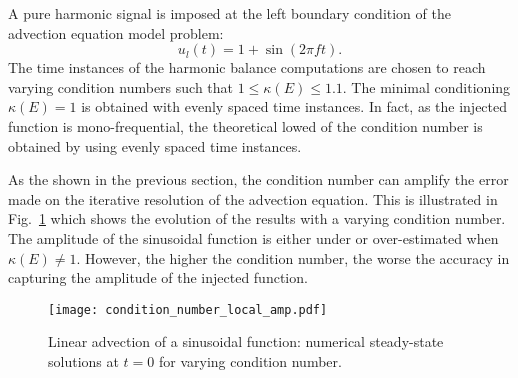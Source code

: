 
A pure harmonic signal is imposed at the left boundary condition
of the advection equation model problem:
\begin{equation}
   u_l (t) = 1 + \sin \left(2 \pi f t\right).
\end{equation}
The time instances of the harmonic balance
computations are chosen to reach varying condition numbers
such that $1 \leq \kappa (E) \leq 1.1$.  
The minimal conditioning
$\kappa(E) = 1$ is obtained with evenly spaced time instances.
In fact, as the injected function is mono-frequential, 
the theoretical lowed of the condition number is obtained by using evenly
spaced time instances.

As the shown in the previous section, the condition number 
can amplify the error made
on the iterative resolution of the advection equation.
This is illustrated in Fig.~\ref{fig:condition_number_local_amp} which 
shows the evolution of the results with a varying condition number.
The amplitude of the
sinusoidal function is either under or over-estimated when
$\kappa (E) \neq 1$. However, 
the higher the condition number, the worse the accuracy in capturing
the amplitude of the injected function.
\begin{figure}[htbp]
  \centering
  \texttt{[image: condition\_number\_local\_amp.pdf]}
  \caption{Linear advection of a sinusoidal function: numerical steady-state 
  solutions at $t=0$ for varying condition number.}
  \label{fig:condition_number_local_amp}
\end{figure}
